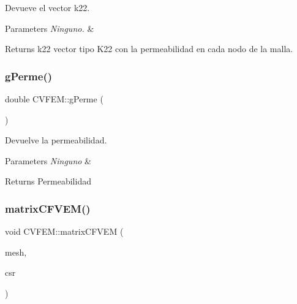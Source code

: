 Devueve el vector k22. 


\begin{DoxyParams}{Parameters}
{\em Ninguno.} & \\
\hline
\end{DoxyParams}
\begin{DoxyReturn}{Returns}
k22 vector tipo K22 con la permeabilidad en cada nodo de la malla. 
\end{DoxyReturn}
\hypertarget{class_c_v_f_e_m_a87658e6d6b736bc98db71cd9dc5ad9a1}{}\label{class_c_v_f_e_m_a87658e6d6b736bc98db71cd9dc5ad9a1} 
\subsubsection{\texorpdfstring{g\+Perme()}{gPerme()}}
{\footnotesize\ttfamily double C\+V\+F\+E\+M\+::g\+Perme (\begin{DoxyParamCaption}{ }\end{DoxyParamCaption})\hspace{0.3cm}{\ttfamily [inline]}}



Devuelve la permeabilidad. 


\begin{DoxyParams}{Parameters}
{\em Ninguno} & \\
\hline
\end{DoxyParams}
\begin{DoxyReturn}{Returns}
Permeabilidad 
\end{DoxyReturn}
\hypertarget{class_c_v_f_e_m_afb5dec32452ca35a1354d0a86f338a39}{}\label{class_c_v_f_e_m_afb5dec32452ca35a1354d0a86f338a39} 
\subsubsection{\texorpdfstring{matrix\+C\+F\+V\+E\+M()}{matrixCFVEM()}}
{\footnotesize\ttfamily void C\+V\+F\+E\+M\+::matrix\+C\+F\+V\+EM (\begin{DoxyParamCaption}\item[{\hyperlink{class_mesh}{Mesh} \&}]{mesh,  }\item[{\hyperlink{class_c_s_r}{C\+SR} \&}]{csr }\end{DoxyParamCaption})}



